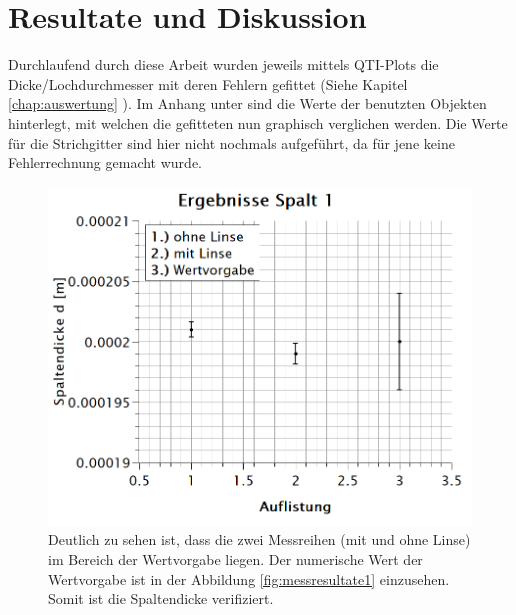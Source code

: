 \chapter{Resultate und Diskussion}
\label{chap:resultateDiskussion}
\thispagestyle{fancy}
Durchlaufend durch diese Arbeit wurden jeweils mittels QTI-Plots die Dicke/Lochdurchmesser mit deren Fehlern gefittet (Siehe Kapitel \ref{chap:auswertung} \textit{}). Im Anhang unter \textit{} sind die Werte der benutzten Objekten hinterlegt, mit welchen die gefitteten nun graphisch verglichen werden. Die Werte für die Strichgitter sind hier nicht nochmals aufgeführt, da für jene keine Fehlerrechnung gemacht wurde.\\
\begin{figure}[h]
\centering
\includegraphics[width=\textwidth]{Bilder/ergebnisse_spalt1.png} 
\caption[Ergebnisse Spalt 1]{Deutlich zu sehen ist, dass die zwei Messreihen (mit und ohne Linse) im Bereich der Wertvorgabe liegen. Der numerische Wert der Wertvorgabe ist in der Abbildung \ref{fig:messresultate1} einzusehen. Somit ist die Spaltendicke verifiziert.}
\label{fig:ergSpalt1}
\end{figure}
\newpage
